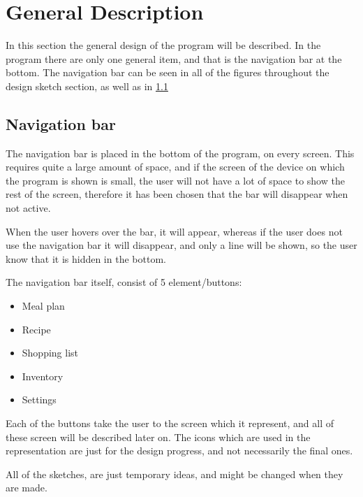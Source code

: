 \section{General Description}

In this section the general design of the program will be described. In the program there are only one general item, and that is the navigation bar at the bottom. The navigation bar can be seen in all of the figures throughout the design sketch section, as well as in \cref{}

\subsection{Navigation bar}

The navigation bar is placed in the bottom of the program, on every screen. This requires quite a large amount of space, and if the screen of the device on which the program is shown is small, the user will not have a lot of space to show the rest of the screen, therefore it has been chosen that the bar will disappear when not active.

When the user hovers over the bar, it will appear, whereas if the user does not use the navigation bar it will disappear, and only a line will be shown, so the user know that it is hidden in the bottom.

The navigation bar itself, consist of 5 element/buttons:

\begin{itemize}
    \item Meal plan
    \item Recipe
    \item Shopping list
    \item Inventory
    \item Settings
\end{itemize}

Each of the buttons take the user to the screen which it represent, and all of these screen will be described later on. The icons which are used in the representation are just for the design progress, and not necessarily the final ones.

All of the sketches, are just temporary ideas, and might be changed when they are made.